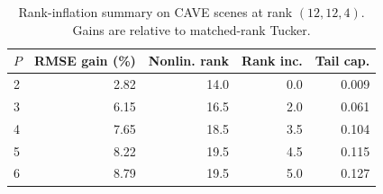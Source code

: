 \begin{table}[!t]
  \centering
  \caption{Rank-inflation summary on CAVE scenes at rank $(12,12,4)$. Gains are relative to matched-rank Tucker.}
  \label{tab:rank-inflation-mechanism}
  \scriptsize
  \begin{tabular}{@{}lrrrr@{}}
    \toprule
    $P$ & RMSE gain (\%) & Nonlin. rank & Rank inc. & Tail cap. \\
    \midrule
    2 & 2.82 & 14.0 & 0.0 & 0.009 \\
    3 & 6.15 & 16.5 & 2.0 & 0.061 \\
    4 & 7.65 & 18.5 & 3.5 & 0.104 \\
    5 & 8.22 & 19.5 & 4.5 & 0.115 \\
    6 & 8.79 & 19.5 & 5.0 & 0.127 \\
    \bottomrule
  \end{tabular}
\end{table}
